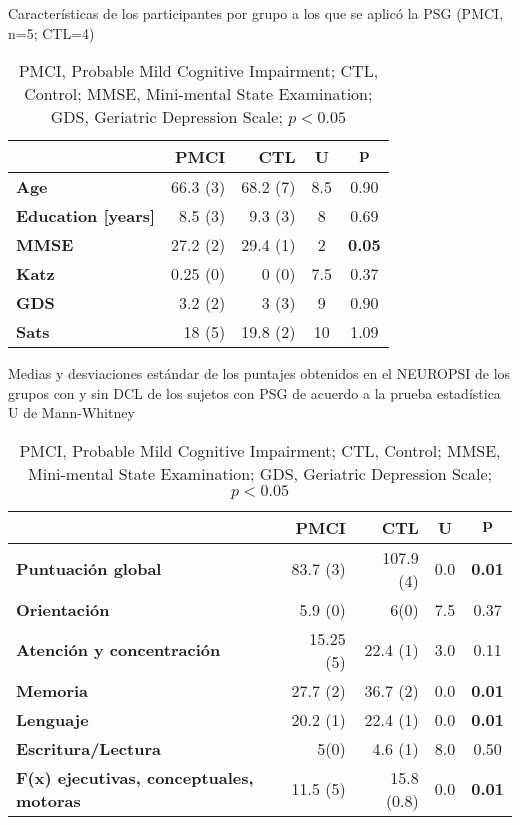 \documentclass[10pt,a4paper]{article}
\newcommand{\pz}{\phantom{.0}}
\begin{document}

\begin{table}
\centering
\caption{Características de los participantes por grupo a los que se aplicó la PSG
(PMCI, n=5; CTL=4)}
\begin{tabularx}{\columnwidth}{Xrrcc}
\toprule 
     & \bf PMCI & \bf CTL & \bf U & $\mathbf{p}$ \\
\midrule
\bf Age               & 66.3  (3) & 68.2  (7) & 8.5   & 0.90 \\
\bf Education [years] &  8.5  (3) &  9.3  (3) & 8\pz  & 0.69 \\ 
\bf MMSE              & 27.2  (2) & 29.4  (1) & 2\pz  & \bf 0.05 \\
\bf Katz              & 0.25  (0) & 0     (0) & 7.5   & 0.37 \\
\bf GDS               &  3.2  (2) & 3     (3) & 9\pz  & 0.90 \\
\bf Sats              & 18    (5) & 19.8  (2) & 10\pz & 1.09 \\
\bottomrule
\end{tabularx}
\caption*{PMCI, Probable Mild Cognitive Impairment; CTL, Control; MMSE, Mini-mental State Examination;
GDS, Geriatric Depression Scale; $p<0.05$}
\end{table}

\begin{table}
\centering
\caption{Medias y desviaciones estándar de los puntajes obtenidos en el NEUROPSI de los grupos con
y sin DCL de los sujetos con PSG de acuerdo a la prueba estadística U de Mann-Whitney}
\begin{tabularx}{\columnwidth}{Xrrcc}
\toprule 
     & \bf PMCI & \bf CTL & \bf U & $\mathbf{p}$ \\
\midrule
\bf Puntuación global                          & 83.7  (3) & 107.9 (4)   & 0.0  & \bf 0.01 \\
\bf Orientación                                &  5.9  (0) &  6\pz (0)   & 7.5  &     0.37 \\ 
\bf Atención y concentración                   & 15.25 (5) & 22.4  (1)   & 3.0  &     0.11 \\
\bf Memoria                                    & 27.7  (2) & 36.7  (2)   & 0.0  & \bf 0.01 \\
\bf Lenguaje                                   & 20.2  (1) & 22.4  (1)   & 0.0  & \bf 0.01 \\
\bf Escritura/Lectura                          &  5\pz (0) &  4.6  (1)   & 8.0  &     0.50 \\
\bf F(x) ejecutivas, conceptuales, motoras     & 11.5  (5) & 15.8  (0.8) & 0.0  & \bf 0.01 \\
\bottomrule
\end{tabularx}
\caption*{PMCI, Probable Mild Cognitive Impairment; CTL, Control; MMSE, Mini-mental State Examination;
GDS, Geriatric Depression Scale; $p<0.05$}
\end{table}
\end{document}
